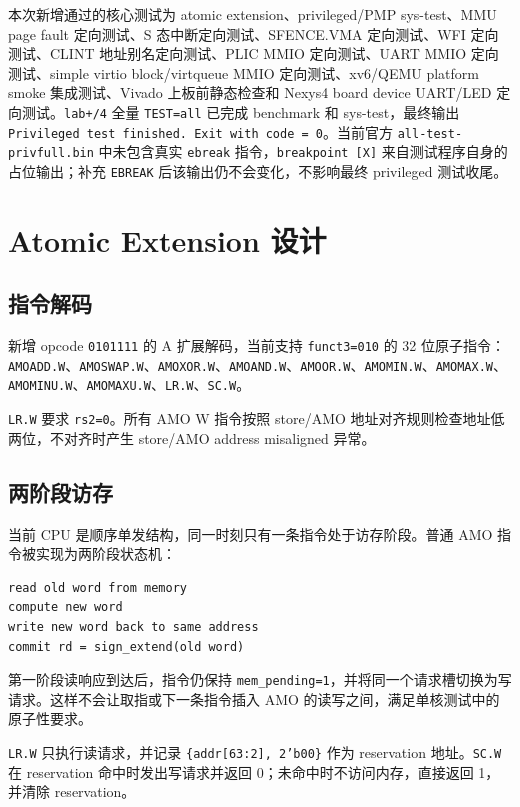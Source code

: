 \documentclass[UTF8,a4paper,11pt]{ctexart}
\begin{document}
本次新增通过的核心测试为 atomic extension、privileged/PMP sys-test、MMU page fault 定向测试、S 态中断定向测试、SFENCE.VMA 定向测试、WFI 定向测试、CLINT 地址别名定向测试、PLIC MMIO 定向测试、UART MMIO 定向测试、simple virtio block/virtqueue MMIO 定向测试、xv6/QEMU platform smoke 集成测试、Vivado 上板前静态检查和 Nexys4 board device UART/LED 定向测试。\texttt{lab+/4} 全量 \texttt{TEST=all} 已完成 benchmark 和 sys-test，最终输出 \texttt{Privileged test finished. Exit with code = 0}。当前官方 \texttt{all-test-privfull.bin} 中未包含真实 \texttt{ebreak} 指令，\texttt{breakpoint [X]} 来自测试程序自身的占位输出；补充 \texttt{EBREAK} 后该输出仍不会变化，不影响最终 privileged 测试收尾。

\section{Atomic Extension 设计}

\subsection{指令解码}

新增 opcode \texttt{0101111} 的 A 扩展解码，当前支持 \texttt{funct3=010} 的 32 位原子指令：\texttt{AMOADD.W}、\texttt{AMOSWAP.W}、\texttt{AMOXOR.W}、\texttt{AMOAND.W}、\texttt{AMOOR.W}、\texttt{AMOMIN.W}、\texttt{AMOMAX.W}、\texttt{AMOMINU.W}、\texttt{AMOMAXU.W}、\texttt{LR.W}、\texttt{SC.W}。

\texttt{LR.W} 要求 \texttt{rs2=0}。所有 AMO W 指令按照 store/AMO 地址对齐规则检查地址低两位，不对齐时产生 store/AMO address misaligned 异常。

\subsection{两阶段访存}

当前 CPU 是顺序单发结构，同一时刻只有一条指令处于访存阶段。普通 AMO 指令被实现为两阶段状态机：

\begin{Verbatim}[fontsize=\small]
read old word from memory
compute new word
write new word back to same address
commit rd = sign_extend(old word)
\end{Verbatim}

第一阶段读响应到达后，指令仍保持 \texttt{mem\_pending=1}，并将同一个请求槽切换为写请求。这样不会让取指或下一条指令插入 AMO 的读写之间，满足单核测试中的原子性要求。

\texttt{LR.W} 只执行读请求，并记录 \texttt{\{addr[63:2], 2'b00\}} 作为 reservation 地址。\texttt{SC.W} 在 reservation 命中时发出写请求并返回 0；未命中时不访问内存，直接返回 1，并清除 reservation。
\end{document}
